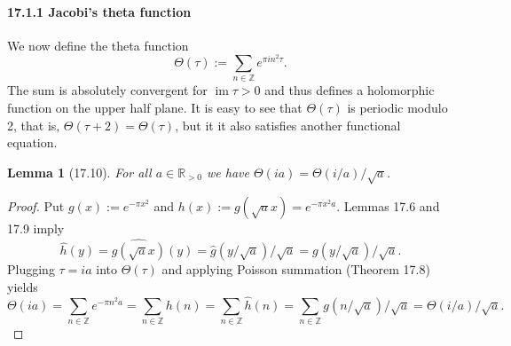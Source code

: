 \documentclass[UTF8,11pt]{ctexart}
\newtheorem*{lemma}{Lemma}
\theoremstyle{definition}
\newcommand{\R}{\mathbb R}
\newcommand{\Z}{\mathbb Z}
\begin{document}
\paragraph{17.1.1 Jacobi's theta function}
We now define the theta function
\[
\Theta(\tau):=\sum_{n\in\Z}e^{\pi in^2\tau}.
\]
The sum is absolutely convergent for $\operatorname{im}\tau>0$ and thus defines a holomorphic function on the upper half plane. It is easy to see that $\Theta(\tau)$ is periodic modulo 2, that is, $\Theta(\tau+2)=\Theta(\tau)$, but it it also satisfies another functional equation.
\begin{lemma}[17.10]
For all $a\in\R_{>0}$ we have $\Theta(ia)=\Theta(i/a)/\sqrt a$.
\end{lemma}
\begin{proof}
Put $g(x):=e^{-\pi x^2}$ and $h(x):=g(\sqrt a x)=e^{-\pi x^2a}$. Lemmas 17.6 and 17.9 imply
\[
\widehat h(y)=\widehat{g(\sqrt a x)}(y)=\widehat g(y/\sqrt a)/\sqrt a=g(y/\sqrt a)/\sqrt a.
\]
Plugging $\tau=ia$ into $\Theta(\tau)$ and applying Poisson summation (Theorem 17.8) yields
\[
\Theta(ia)=\sum_{n\in\Z}e^{-\pi n^2a}=\sum_{n\in\Z}h(n)
=\sum_{n\in\Z}\widehat h(n)
=\sum_{n\in\Z}g(n/\sqrt a)/\sqrt a=\Theta(i/a)/\sqrt a.
\]
\end{proof}
\end{document}
